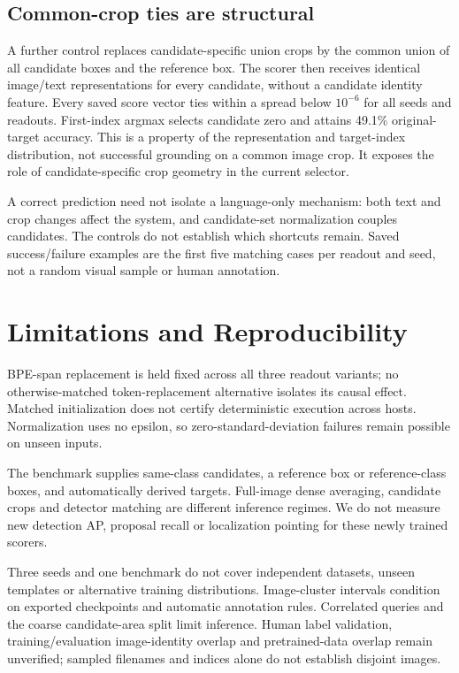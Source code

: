\documentclass[10pt,twocolumn,letterpaper]{article}
\begin{document}
\subsection{Common-crop ties are structural}
A further control replaces candidate-specific union crops by the common union of all candidate boxes and the reference box. The scorer then receives identical image/text representations for every candidate, without a candidate identity feature. Every saved score vector ties within a spread below $10^{-6}$ for all seeds and readouts. First-index argmax selects candidate zero and attains 49.1\% original-target accuracy. This is a property of the representation and target-index distribution, not successful grounding on a common image crop. It exposes the role of candidate-specific crop geometry in the current selector.

A correct prediction need not isolate a language-only mechanism: both text and crop changes affect the system, and candidate-set normalization couples candidates. The controls do not establish which shortcuts remain. Saved success/failure examples are the first five matching cases per readout and seed, not a random visual sample or human annotation.

\section{Limitations and Reproducibility}
BPE-span replacement is held fixed across all three readout variants; no otherwise-matched token-replacement alternative isolates its causal effect. Matched initialization does not certify deterministic execution across hosts. Normalization uses no epsilon, so zero-standard-deviation failures remain possible on unseen inputs.

The benchmark supplies same-class candidates, a reference box or reference-class boxes, and automatically derived targets. Full-image dense averaging, candidate crops and detector matching are different inference regimes. We do not measure new detection AP, proposal recall or localization pointing for these newly trained scorers. 

Three seeds and one benchmark do not cover independent datasets, unseen templates or alternative training distributions. Image-cluster intervals condition on exported checkpoints and automatic annotation rules. Correlated queries and the coarse candidate-area split limit inference. Human label validation, training/evaluation image-identity overlap and pretrained-data overlap remain unverified; sampled filenames and indices alone do not establish disjoint images.
\end{document}
